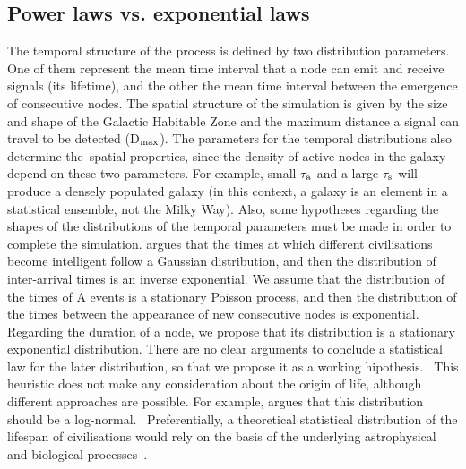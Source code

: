 \documentclass[crop]{CSLB}
\newcommand{\cetis}{nodes}
\begin{document}
    

\subsection{Power laws vs. exponential laws}\label{SS_PDF_shape}

The temporal structure of the process is defined by two distribution
parameters. One of them represent the mean time interval that a node can
emit and receive signals (its lifetime), and the other the mean time interval between the
emergence of consecutive \cetis{}.
%
The spatial structure of the simulation is
given by the size and shape of the Galactic Habitable Zone and the maximum
distance a signal can travel to be detected (D$_{\rm max}$).
%
The parameters for
the temporal distributions also determine the spatial properties, since the
density of active \cetis{} in the galaxy depend on these two parameters.
%
For
example, small $\tau_{\rm a}$ and a large $\tau_{\rm s}$ will produce a densely
populated galaxy (in this context, a galaxy is an element in a 
statistical ensemble, not the Milky Way).
%
Also, some hypotheses regarding the shapes of the
distributions of the temporal parameters must be made in order to complete the
simulation.
%
\citet{forgan_spatiotemporal_2011} argues that the times at which
different civilisations become intelligent follow a Gaussian distribution, and
then the distribution of inter-arrival times is an inverse exponential.
%
We
assume that the distribution of the times of A events is a stationary Poisson
process, and then the distribution of the times between the appearance of new
consecutive nodes is exponential.
%
Regarding the duration of a node, we
propose that its distribution is a stationary
exponential distribution.
%
There are no clear arguments to conclude a
statistical law for the later distribution, so that we propose it as a working
hipothesis.  
%
This heuristic does not make any consideration about the origin of life, although
different approaches are possible.
%
For example,
\citet{maccone_lognormals_2014} argues that this distribution should be a log-normal. 
%
Preferentially, a theoretical statistical distribution of the lifespan of
civilisations would rely on the basis of the underlying
astrophysical and biological processes \citep{balbi_impact_2018}. 
\end{document}
